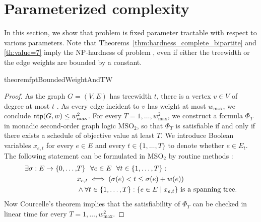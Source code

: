 \section{Parameterized complexity}
\label{sec:parameterized}
In this section, we show that problem {\xxxNTP} is fixed parameter tractable with 
respect to various parameters. 
Note that Theorems~\ref{thm:hardness_complete_bipartite} and \ref{th:value=7} imply the NP-hardness 
of problem {\xxxNTP}, even if either the treewidth or the edge weights are bounded by a constant. 

\begin{restatable}{theorem}{fptBoundedWeightAndTW}
\label{th:fpt_weights_and_tw_bounded}
\end{restatable}
\begin{proof}
As the graph $G=(V,E)$ has treewidth $t$, there is a vertex $v\in V$ of degree at most $t$ .
As every edge incident to $v$ has weight at most $w_{\max}$, we conclude $\operatorname{\textsf{ntp}}(G,w)\le w_{\max}^2$. 
For every $T=1,\ldots,w_{\max}^2$, we construct a formula $\Phi_T$ in monadic second-order 
graph logic $\text{MSO}_2$, so that $\Phi_T$ is satisfiable if and only if there exists a schedule 
of objective value at least $T$. 
We introduce Boolean variables $x_{e,t}$ for every $e\in E$ and every $t\in \{1,\dots,T\}$
to denote whether $e\in E_t$. 
The following statement can be formulated in $\text{MSO}_2$ by routine methods :
\begin{align*}
\exists \sigma: E\to\{0,\ldots,&T\} ~~\forall e\in E ~~\forall t\in\{1,\ldots,T\}: \\
& x_{e,t} \iff \left(\sigma(e) < t \leq \sigma(e) + w(e)\right)\\
& \land \forall t\in\{1,\ldots,T\}: \{ e\in E \mid x_{e,t} \} \text{ is a spanning tree.}
\end{align*}
Now Courcelle's theorem \cite{courcelle1990monadic} implies that the satisfiability of $\Phi_T$ 
can be checked in linear time for every $T=1,\ldots,w_{\max}^2$.
 
\end{proof}

